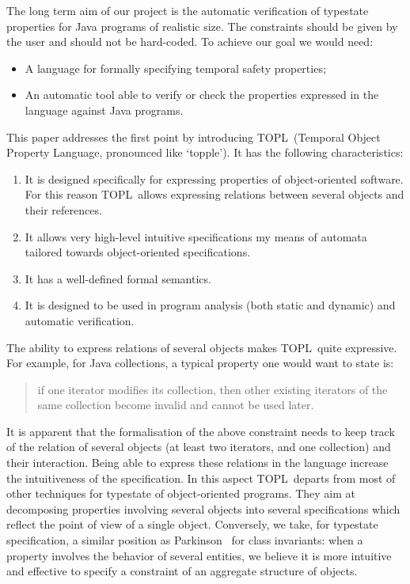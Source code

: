 \documentclass[preprint]{sigplanconf} %
\newcommand{\TPL}{TOPL}
\newcommand{\note}[2]{\textcolor{gray}{[\textcolor{red}{#1}: #2]}}
\newcommand{\rg}[1]{\note{rg}{#1}}
\theoremstyle{definition}
\theoremstyle{remark}
\begin{document}
The long term aim of our project is the automatic verification of typestate properties for Java programs of realistic size.
The constraints should be given by the user and should not be hard-coded.
To achieve our goal we would need:
\begin{itemize}
\item A language for formally specifying temporal safety properties;
\item An automatic tool able to verify or check the properties expressed in the language against Java programs.
\end{itemize}
This paper addresses the first point by introducing \TPL  \ (Temporal Object Property Language, pronounced like `topple').
It has the following characteristics:
\begin{enumerate}
\item It is designed specifically for expressing properties of object-oriented software. For this reason \TPL \ allows expressing relations between several objects and their references.
\item It allows very high-level intuitive specifications my means of automata tailored towards object-oriented specifications.
\item  It has a well-defined formal semantics.
\item  It is designed to be used in program analysis (both static and dynamic) and automatic verification.
\end{enumerate}
The ability to express relations of several objects makes  \TPL \ quite expressive. For example, for Java collections, a typical property one would want to state is:

\begin{quote}
if one iterator modifies its collection, then other existing iterators of the same collection become invalid and cannot be used later.
\end{quote}
\noindent 
It is apparent that the formalisation of the above constraint needs to keep track of the relation of several objects (at least two iterators, and one collection) and their interaction. Being able to express these relations in the language 
increase the intuitiveness of the specification.
In this aspect \TPL \ departs from most of other techniques for typestate of object-oriented programs. They aim at decomposing properties involving several objects into several specifications which reflect 
the point of view of a single object. Conversely,  we take, for typestate specification, a similar position as Parkinson~\cite{parkinson-iwaco2007} for class invariants: when a property involves the behavior of  several entities, we believe it is more intuitive and effective to specify a constraint of  an aggregate structure of objects. 
   
\end{document}
